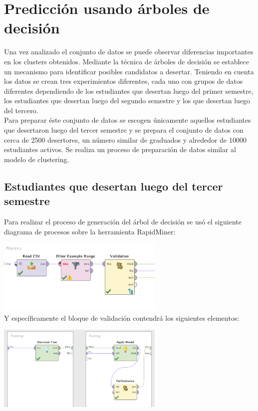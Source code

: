 \documentclass[fleqn,10pt]{SelfArx} %
\begin{document}
\section{Predicción usando árboles de decisión}

Una vez analizado el conjunto de datos se puede observar diferencias importantes en los clusters obtenidos. Mediante la técnica de árboles de decisión se establece un mecanismo para identificar posibles candidatos a desertar. Teniendo en cuenta los datos se crean tres experimientos diferentes, cada uno con grupos de datos diferentes dependiendo de los estudiantes que desertan luego del primer semestre, los estudiantes que desertan luego del segundo semestre y los que desertan luego del tercero. \\

Para preparar éste conjunto de datos se escogen únicamente aquellos estudiantes que desertaron luego del tercer semestre y se prepara el conjunto de datos con cerca de 2500 desertores, un número similar de graduados y alrededor de 10000 estudiantes activos. Se realiza un proceso de preparación de datos similar al modelo de clustering. \\

\subsection{Estudiantes que desertan luego del tercer semestre}

Para realizar el proceso de generación del árbol de decisión se usó el siguiente diagrama de procesos sobre la herramienta RapidMiner:

\includegraphics[width=8cm]{img/tree1.png} \\ 

Y específicamente el bloque de validación contendrá los siguientes elementos: 

\includegraphics[width=8cm]{img/tree2.png} \\ 
\end{document}
